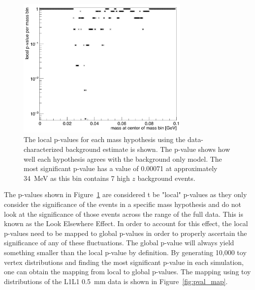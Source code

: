\begin{figure}[htb]
  \centering
      \includegraphics[width=0.75\textwidth]{pics/results/highz_pval.png}
  \caption[Local p-values for the L1L1 dataset]{The local p-values for each mass hypothesis using the data-characterized background estimate is shown. The p-value shows how well each hypothesis agrees with the background only model. The most significant p-value has a value of 0.00071 at approximately 34~MeV as this bin contains 7 high $z$ background events.}
  \label{fig:highz_pval}
\end{figure} 

The p-values shown in Figure~\ref{fig:highz_pval} are considered t be "local" p-values as they only consider the significance of the events in a specific mass hypothesis and do not look at the significance of those events across the range of the full data. This is known as the Look Elsewhere Effect. In order to account for this effect, the local p-values need to be mapped to global p-values in order to properly ascertain the significance of any of these fluctuations. The global p-value will always yield something smaller than the local p-value by definition. By generating 10,000 toy vertex distributions and finding the most significant p-value in each simulation, one can obtain the mapping from local to global p-values. The mapping using toy distributions of the L1L1 0.5~mm data is shown in Figure~\ref{fig:pval_map}.


